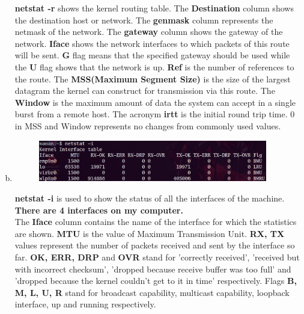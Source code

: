 \documentclass[a4paper,10pt]{article}
\newlength{\strutheight}
\begin{document}
\begin{enumerate}[a)]
\begin{adjustbox}{valign=T,raise=\strutheight,minipage={\linewidth}}
\begin{figure}
		\end{figure}
		\strut{}
		\textbf{netstat -r} shows the kernel routing table. The \textbf{Destination} column shows the destination host or network. The \textbf{genmask} column represents the netmask of the network. The \textbf{gateway} column shows the gateway of the network. \textbf{Iface} shows the network interfaces to which packets of this route will be sent. \textbf{G} flag means that the specified gateway should be used while the \textbf{U} flag shows that the network is up. \textbf{Ref} is the number of references to the route. The \textbf{MSS(Maximum Segment Size)} is the size of the	largest datagram the kernel can construct for transmission via this route. The \textbf{Window} is the maximum amount of data the system can accept in a single burst from a remote host. The acronym \textbf{irtt} is the initial round trip time. 0 in MSS and Window represents no changes from commonly used values.
	\end{adjustbox} 
	\item
	\begin{adjustbox}{valign=T,raise=\strutheight,minipage={\linewidth}}
		\begin{figure}
			\includegraphics[width=10cm]{netstat3.png}
		\end{figure}
		\strut{}
		\textbf{netstat -i} is used to show the status of all the interfaces of the machine. \textbf{There are 4 interfaces on my computer.} \\
		The \textbf{Iface} column contains the name of the interface for which the statistics are shown. \textbf{MTU} is the value of Maximum Transmission Unit. \textbf{RX, TX} values represent the number of packets received and sent by the interface so far. \textbf{OK, ERR, DRP} and \textbf{OVR} stand for 'correctly received', 'received but with incorrect checksum', 'dropped because receive buffer was too full' and 'dropped because the kernel couldn’t get to it in time' respectively. Flags \textbf{B, M, L, U, R} stand for broadcast capability, multicast capability, loopback interface, up and running respectively.
	\end{adjustbox} 
	\begin{adjustbox}{valign=T,raise=\strutheight,minipage={\linewidth}}
		\begin{figure}

\end{figure}
\end{adjustbox}
\end{enumerate}
\end{document}
